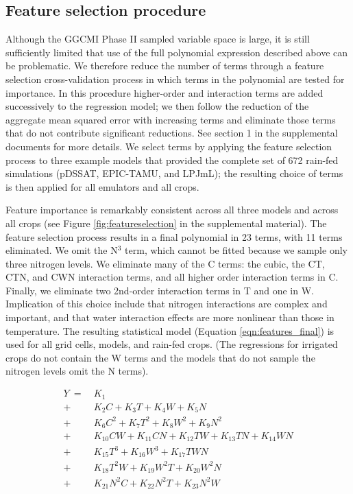 \documentclass[esd, final]{copernicus} %
\begin{document}
\subsection{Feature selection procedure}
Although the GGCMI Phase II sampled variable space is large, it is still sufficiently limited that use of the full polynomial expression described above can be problematic. We therefore reduce the number of terms through a feature selection cross-validation process in which terms in the polynomial are tested for importance. In this procedure higher-order and interaction terms are added successively to the regression model; we then follow the reduction of the aggregate mean squared error with increasing terms and eliminate those terms that do not contribute significant reductions. See section 1 in the supplemental documents for more details. We select terms by applying the feature selection process to three example models that provided the complete set of 672 rain-fed simulations (pDSSAT, EPIC-TAMU, and LPJmL); the resulting choice of terms is then applied for all emulators and all crops.

Feature importance is remarkably consistent across all three models and across all crops (see Figure \ref{fig:featureselection} in the supplemental material). The feature selection process results in a final polynomial in 23 terms, with 11 terms eliminated. We omit the N$^3$ term, which cannot be fitted because we sample only three nitrogen levels. We eliminate many of the C terms: the cubic, the CT, CTN, and CWN interaction terms, and all higher order interaction terms in C. Finally, we eliminate two 2nd-order interaction terms in T and one in W. Implication of this choice include that nitrogen interactions are complex and important, and that water interaction effects are more nonlinear than those in temperature. The resulting statistical model (Equation \ref{eqn:features_final}) is used for all grid cells, models, and rain-fed crops. (The regressions for irrigated crops do not contain the W terms and the models that do not sample the nitrogen levels omit the N terms).

\begin{align}
    \label{eqn:features_final}
    Y\ = \ & K_{1}  \\
		+ \ & K_{2}  C     + K_{3}  T     + K_{4}  W     + K_{5}  N   \nonumber \\
		+ \ & K_{6}  C^2   + K_{7}  T^2   + K_{8}  W^2   + K_{9}  N^2 \nonumber \\
		+ \ & K_{10} C W   + K_{11} C N   + K_{12} T W   + K_{13} T N + K_{14} W N \nonumber \\ %
		+ \ & K_{15} T^3   + K_{16} W^3   + K_{17} T W N  \nonumber \\ %
		+ \ & K_{18} T^2 W + K_{19} W^2 T + K_{20} W^2 N  \nonumber \\ %
		+ \ & K_{21} N^2 C + K_{22} N^2 T + K_{23} N^2 W  \nonumber    %
\end{align}
\end{document}

